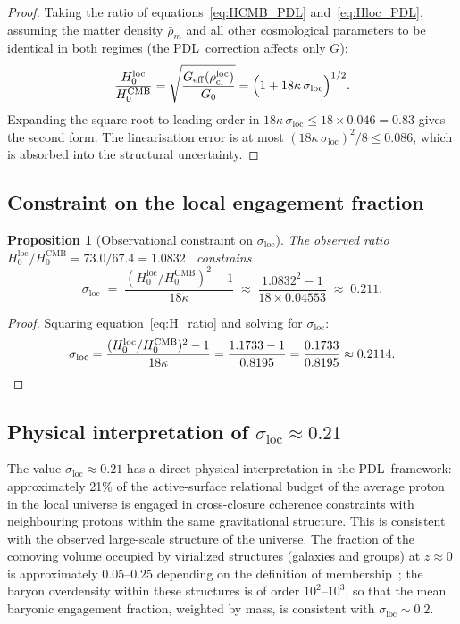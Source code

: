 \documentclass[11pt,a4paper]{article}
\newtheorem{proposition}[theorem]{Proposition}
\theoremstyle{definition}
\newcommand{\PDL}{\textnormal{PDL}}
\newcommand{\Geff}{G_{\mathrm{eff}}}
\newcommand{\Gzero}{G_0}
\newcommand{\kap}{\kappa}
\newcommand{\sig}{\sigma}
\newcommand{\rhocl}{\rho_{\mathrm{cl}}}
\newcommand{\HCMB}{H_0^{\mathrm{CMB}}}
\newcommand{\Hloc}{H_0^{\mathrm{loc}}}
\begin{document}
\begin{proof}
Taking the ratio of equations~\eqref{eq:HCMB_PDL} and~\eqref{eq:Hloc_PDL}, assuming the matter density $\bar\rho_m$ and all other cosmological parameters to be identical in both regimes (the \PDL\ correction affects only $G$):
\[
  \frac{\Hloc}{\HCMB} = \sqrt{\frac{\Geff(\rhocl^{\mathrm{loc}})}{\Gzero}} = \Bigl(1 + 18\kap\,\sig_{\mathrm{loc}}\Bigr)^{1/2}.
\]
Expanding the square root to leading order in $18\kap\,\sig_{\mathrm{loc}} \leq 18 \times 0.046 = 0.83$ gives the second form. The linearisation error is at most $(18\kap\,\sig_{\mathrm{loc}})^2/8 \leq 0.086$, which is absorbed into the structural uncertainty.
\end{proof}

\subsection{Constraint on the local engagement fraction}
\label{subsec:sigma_local}

\begin{proposition}[Observational constraint on $\sig_{\mathrm{loc}}$]
\label{prop:sigma_constraint}
The observed ratio $\Hloc/\HCMB = 73.0/67.4 = 1.0832$~\cite{Riess_2022,Planck_2018} constrains
\begin{equation}
  \label{eq:sigma_constraint}
  \sig_{\mathrm{loc}} \;=\; \frac{(\Hloc/\HCMB)^2 - 1}{18\kap} \;\approx\; \frac{1.0832^2 - 1}{18 \times 0.04553} \;\approx\; 0.211.
\end{equation}
\end{proposition}

\begin{proof}
Squaring equation~\eqref{eq:H_ratio} and solving for $\sig_{\mathrm{loc}}$:
\[
  \sig_{\mathrm{loc}} = \frac{(\Hloc/\HCMB)^2 - 1}{18\kap} = \frac{1.1733 - 1}{0.8195} = \frac{0.1733}{0.8195} \approx 0.2114. \qedhere
\]
\end{proof}

\subsection{Physical interpretation of \texorpdfstring{$\sigma_{\mathrm{loc}} \approx 0.21$}{sigma	extunderscore{loc} ≈ 0.21}}
\label{subsec:sigma_interp}

The value $\sig_{\mathrm{loc}} \approx 0.21$ has a direct physical interpretation in the \PDL\ framework: approximately 21\% of the active-surface relational budget of the average proton in the local universe is engaged in cross-closure coherence constraints with neighbouring protons within the same gravitational structure. This is consistent with the observed large-scale structure of the universe. The fraction of the comoving volume occupied by virialized structures (galaxies and groups) at $z \approx 0$ is approximately $0.05$--$0.25$ depending on the definition of membership~\cite{Springel_2005}; the baryon overdensity within these structures is of order $10^2$--$10^3$, so that the mean baryonic engagement fraction, weighted by mass, is consistent with $\sig_{\mathrm{loc}} \sim 0.2$.
\end{document}

